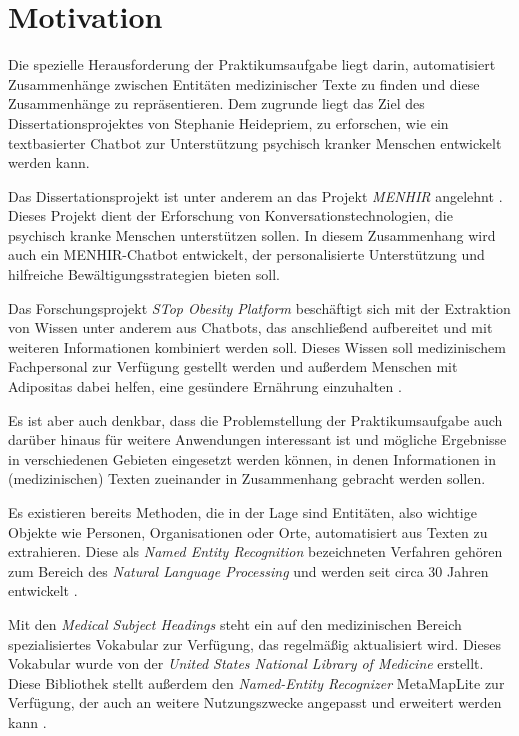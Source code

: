 \section{Motivation}

Die spezielle Herausforderung der Praktikumsaufgabe liegt darin, automatisiert Zusammenhänge zwischen Entitäten medizinischer Texte zu finden und diese Zusammenhänge zu repräsentieren. Dem zugrunde liegt das Ziel des Dissertationsprojektes von Stephanie Heidepriem, zu erforschen, wie ein textbasierter Chatbot zur Unterstützung 
psychisch kranker Menschen entwickelt werden kann. 

Das Dissertationsprojekt  ist unter anderem an das Projekt \emph{MENHIR} angelehnt \cite{menhir}. Dieses Projekt dient der Erforschung von Konversationstechnologien, die psychisch kranke Menschen unterstützen sollen. In diesem Zusammenhang wird auch 
ein MENHIR-Chatbot entwickelt, der personalisierte Unterstützung und hilfreiche Bewältigungsstrategien bieten soll. 

Das Forschungsprojekt \emph{STop Obesity Platform} beschäftigt sich mit der Extraktion von Wissen unter anderem aus Chatbots, das anschließend aufbereitet und mit weiteren Informationen kombiniert werden soll. Dieses Wissen soll medizinischem Fachpersonal zur Verfügung gestellt werden und außerdem Menschen mit Adipositas dabei helfen, eine gesündere Ernährung einzuhalten \cite{stopobesity}.


Es ist aber auch denkbar, dass die Problemstellung der Praktikumsaufgabe auch darüber hinaus für weitere Anwendungen interessant ist und mögliche Ergebnisse in verschiedenen Gebieten eingesetzt werden können, in denen Informationen in (medizinischen) Texten zueinander in Zusammenhang gebracht werden sollen.

Es existieren bereits Methoden, die in der Lage sind Entitäten, also wichtige Objekte wie Personen, Organisationen oder Orte, automatisiert aus Texten zu extrahieren. Diese als \emph{Named Entity Recognition} bezeichneten Verfahren gehören zum Bereich des \emph{Natural Language Processing} und werden seit circa 30 Jahren entwickelt \cite{trends_in_ner}. 

Mit den \emph{Medical Subject Headings} \cite{mesh} steht ein auf den medizinischen Bereich spezialisiertes Vokabular zur Verfügung, das regelmäßig aktualisiert wird. Dieses Vokabular wurde von der \emph{United States National Library of Medicine} erstellt. Diese Bibliothek stellt außerdem den \emph{Named-Entity Recognizer}
\glqq MetaMapLite\grqq{} zur Verfügung, der auch an weitere Nutzungszwecke angepasst und erweitert werden kann \cite{metamaplite}. 

